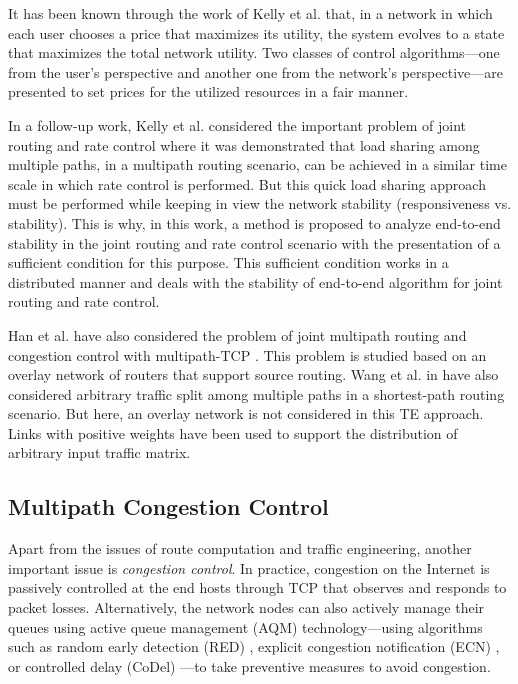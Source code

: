 \documentclass[10pt]{IEEEtran}
\begin{document}
It has been known through the work of Kelly et al. \cite{kelly1998rate} that, in a network in which each user chooses a price that maximizes its utility, the system evolves to a state that maximizes the total network utility. Two classes of control algorithms---one from the user's perspective and another one from the network's perspective---are presented to set prices for the utilized resources in a fair manner. 

In a follow-up work, Kelly et al. \cite{kelly2005stability} considered the important problem of joint routing and rate control where it was demonstrated that load sharing among multiple paths, in a multipath routing scenario, can be achieved in a similar time scale in which rate control is performed. But this quick load sharing approach must be performed while keeping in view the network stability (responsiveness vs. stability). This is why, in this work, a method is proposed to analyze end-to-end stability in the joint routing and rate control scenario with the presentation of a sufficient condition for this purpose. This sufficient condition works in a distributed manner and deals with the stability of end-to-end algorithm for joint routing and rate control.

Han et al. have also considered the problem of joint multipath routing and congestion control with multipath-TCP \cite{han2006multi}. This problem is studied based on an overlay network of routers that support source routing. Wang et al. in \cite{wang2001internet} have also considered arbitrary traffic split among multiple paths in a shortest-path routing scenario. But here, an overlay network is not considered in this TE approach. Links with positive weights have been used to support the distribution of arbitrary input traffic matrix.



\subsection{Multipath Congestion Control}



Apart from the issues of route computation and traffic engineering, another important issue is \textit{congestion control}. In practice, congestion on the Internet is passively controlled at the end hosts through TCP that observes and responds to packet losses. Alternatively, the network nodes can also actively manage their queues using active queue management (AQM) technology---using algorithms such as random early detection (RED) \cite{floyd1993random}, explicit congestion notification (ECN) \cite{floyd1994tcp}, or controlled delay (CoDel) \cite{nichols2012controlling}---to take preventive measures to avoid congestion.
\end{document}
